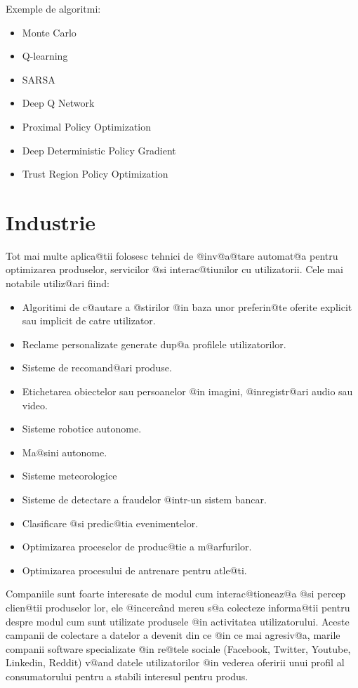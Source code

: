 Exemple de algoritmi:
\begin{itemize}
	\item Monte Carlo
	\item Q-learning
	\item SARSA
	\item Deep Q Network
	\item Proximal Policy Optimization
	\item Deep Deterministic Policy Gradient
	\item Trust Region Policy Optimization
\end{itemize}

\section{Industrie}

	Tot mai multe aplica@tii folosesc tehnici de @inv@a@tare automat@a pentru optimizarea produselor, servicilor @si interac@tiunilor cu utilizatorii. Cele mai notabile utiliz@ari fiind:
\begin{itemize}
	\item Algoritimi de c@autare a @stirilor @in baza unor preferin@te oferite explicit sau implicit de catre utilizator.
	\item Reclame personalizate generate dup@a profilele utilizatorilor.
	\item Sisteme de recomand@ari produse.
	\item Etichetarea obiectelor sau persoanelor @in imagini, @inregistr@ari audio sau video.
	\item Sisteme robotice autonome.
	\item Ma@sini autonome.
	\item Sisteme meteorologice
	\item Sisteme de detectare a fraudelor @intr-un sistem bancar.
	\item Clasificare @si predic@tia evenimentelor. 
	\item Optimizarea proceselor de produc@tie a m@arfurilor.
	\item Optimizarea procesului de antrenare pentru atle@ti.
\end{itemize}

	Companiile sunt foarte interesate de modul cum interac@tioneaz@a @si percep clien@tii produselor lor, ele @incerc\^ and mereu s@a colecteze informa@tii pentru despre modul cum sunt utilizate produsele @in activitatea utilizatorului. Aceste campanii de colectare a datelor a devenit din ce @in ce mai agresiv@a, marile companii software specializate @in re@tele sociale (Facebook, Twitter, Youtube, Linkedin, Reddit) v@and datele utilizatorilor @in vederea oferirii unui profil al consumatorului pentru a stabili interesul pentru produs. 
	 
